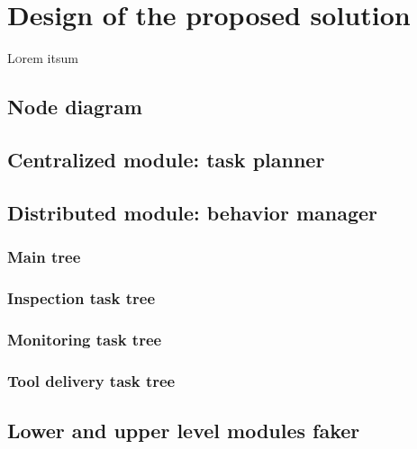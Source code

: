 \chapter{Design of the proposed solution}
\label{ch:DesignOfTheProposedSolution}
\lettrine[lraise=-0.1, lines=2, loversize=0.2]{L}{o}rem itsum

\section{Node diagram}
\label{sec:NodeDiagram}

\section{Centralized module: task planner}
\label{sec:Centralized module:TaskPlanner}

\section{Distributed module: behavior manager}
\label{sec:Distributed module: behavior manager}

\subsection{Main tree}
\label{sec:MainTree}

\subsection{Inspection task tree}
\label{sec:InspectionTaskTree}

\subsection{Monitoring task tree}
\label{sec:MonitoringTaskTree}

\subsection{Tool delivery task tree}
\label{sec:ToolDeliveryTaskTree}

\section{Lower and upper level modules faker}
\label{sec:LowerAndUpperLevelModulesFaker}
